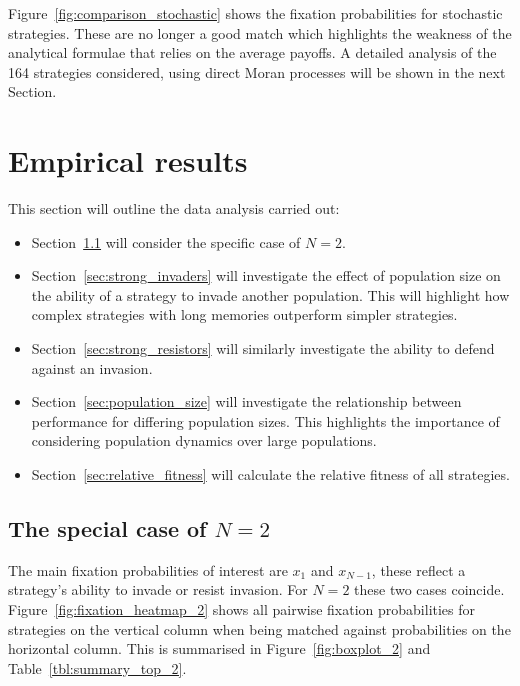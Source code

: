 \documentclass{article}
\begin{document}
Figure~\ref{fig:comparison_stochastic} shows the fixation probabilities for
stochastic strategies. These are no longer a good match which highlights the
weakness of the analytical formulae that relies on the average payoffs. A
detailed analysis of the 164 strategies considered, using direct Moran processes
will be shown in the next Section.

\section{Empirical results}\label{sec:empirical_results}

This section will outline the data analysis carried out:

\begin{itemize}
    \item Section~\ref{sec:two_individuals} will consider the specific case of
        \(N=2\).
    \item Section~\ref{sec:strong_invaders} will investigate the effect of
        population size on the ability of a strategy to invade another
        population. This will highlight how complex strategies with long
        memories outperform simpler strategies.
    \item Section~\ref{sec:strong_resistors} will similarly investigate the
        ability to defend against an invasion.
    \item Section~\ref{sec:population_size} will investigate the relationship
        between performance for differing population sizes. This highlights the
        importance of considering population dynamics over large populations.
    \item Section~\ref{sec:relative_fitness} will calculate the relative fitness of all
        strategies.
\end{itemize}

\subsection{The special case of \(N=2\)}\label{sec:two_individuals}

The main fixation probabilities of interest are \(x_1\) and \(x_{N-1}\), these
reflect a strategy's ability to invade or resist invasion.
For \(N=2\) these two cases coincide. Figure~\ref{fig:fixation_heatmap_2} shows
all pairwise fixation probabilities for strategies on the vertical column when
being matched against probabilities on the horizontal column. This is summarised
in Figure~\ref{fig:boxplot_2} and Table~\ref{tbl:summary_top_2}.
\end{document}

